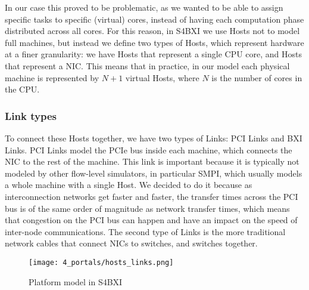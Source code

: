 In our case this proved to be problematic, as we wanted to be able to assign
specific tasks to specific (virtual) cores, instead of having each computation
phase distributed across all cores. For this reason, in S4BXI we use Hosts not
to model full machines, but instead we define two types of Hosts, which
represent hardware at a finer granularity: we have Hosts that represent a single
CPU core, and Hosts that represent a NIC. This means that in practice, in our
model each physical machine is represented by $N + 1$ virtual Hosts, where $N$
is the number of cores in the CPU.

\subsubsection{Link types} To connect these Hosts together, we have two types of
Links: PCI Links and BXI Links. PCI Links model the PCIe bus inside each
machine, which connects the NIC to the rest of the machine. This link is
important because it is typically not modeled by other flow-level simulators, in
particular SMPI, which usually models a whole machine with a single Host. We
decided to do it because as interconnection networks get faster and faster, the
transfer times across the PCI bus is of the same order of magnitude as network
transfer times, which means that congestion on the PCI bus can happen and have
an impact on the speed of inter-node communications. The second type of Links is
the more traditional network cables that connect NICs to switches, and switches
together.

\begin{figure}[!ht]
    \centering
    \texttt{[image: 4\_portals/hosts\_links.png]}
    \caption{Platform model in S4BXI}
    \label{fig:4_portals:Hosts_Links}
\end{figure}


